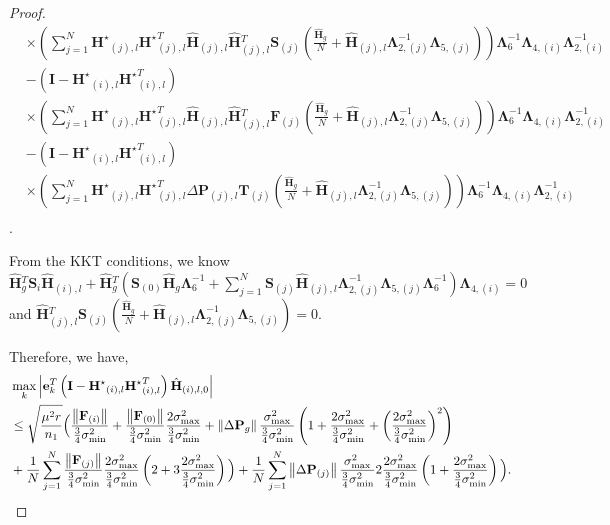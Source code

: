 \documentclass[twoside,11pt]{article}
\newcommand{\abs}[1]{\left\vert #1\right\vert}
\newcommand{\norm}[1]{\left\lVert#1\right\rVert}
\newcommand{\matF}{\mathbf{F}}
\newcommand{\hmatH}{{\hat{\mathbf{H}}}{}}
\newcommand{\matHst}{{\mathbf{H}^\star}}
\newcommand{\matI}{\mathbf{I}}
\newcommand{\matP}{\mathbf{P}}
\newcommand{\matT}{\mathbf{T}}
\newcommand{\matLambda}{\mathbf{\Lambda}}
\newcommand{\matS}{\mathbf{S}}
\newcommand{\vece}{\mathbf{e}}
\newcommand{\gop}{\sigma_{\max}}
\newcommand{\murnone}{\frac{\mu^2 r}{n_1}}
\newcommand{\sms}{\sigma_{\min}^2}
\newcommand{\tkappa}{\frac{2\gop^2}{\frac{3}{4}\sms}}
\newcommand{\brtkappa}{\left(\frac{2\gop^2}{\frac{3}{4}\sms}\right)}
\begin{document}
\begin{proof}
\begin{align*}
&\times\left(\sum_{j=1}^N\matHst_{(j),l}\matHst_{(j),l}^T\hmatH_{(j),l}\hmatH_{(j),l}^T\matS_{(j)}\left(\frac{\hmatH_{g}}{N}+\hmatH_{(j),l} \matLambda_{2,(j)}^{-1} \matLambda_{5,(j)}\right)\right)\matLambda_{6}^{-1}\matLambda_{4,(i)}\matLambda_{2,(i)}^{-1}\\
&-\left(\matI-\matHst_{(i),l}\matHst_{(i),l}^T\right)\\
&\times\left(\sum_{j=1}^N\matHst_{(j),l}\matHst_{(j),l}^T\hmatH_{(j),l}\hmatH_{(j),l}^T\matF_{(j)}\left(\frac{\hmatH_{g}}{N}+\hmatH_{(j),l} \matLambda_{2,(j)}^{-1} \matLambda_{5,(j)}\right)\right)\matLambda_{6}^{-1}\matLambda_{4,(i)}\matLambda_{2,(i)}^{-1}\\
&-\left(\matI-\matHst_{(i),l}\matHst_{(i),l}^T\right)\\
&\times\left(\sum_{j=1}^N\matHst_{(j),l}\matHst_{(j),l}^T\Delta\matP_{(j),l}\matT_{(j)}\left(\frac{\hmatH_{g}}{N}+\hmatH_{(j),l} \matLambda_{2,(j)}^{-1} \matLambda_{5,(j)}\right)\right)\matLambda_{6}^{-1}\matLambda_{4,(i)}\matLambda_{2,(i)}^{-1}\\
\end{align*}.

From the KKT conditions, we know $\hmatH_g^T\matS_{i}\hmatH_{(i),l}+\hmatH_g^T\left(\matS_{(0)}\hmatH_{g}\matLambda_{6}^{-1}+\sum_{j=1}^N\matS_{(j)}\hmatH_{(j),l} \matLambda_{2,(j)}^{-1} \matLambda_{5,(j)}\matLambda_{6}^{-1}\right)\matLambda_{4,(i)}=0$ and $\hmatH_{(j),l}^T\matS_{(j)}\left(\frac{\hmatH_{g}}{N}+\hmatH_{(j),l} \matLambda_{2,(j)}^{-1} \matLambda_{5,(j)}\right)=0$.

Therefore, we have,
\begin{align}
&\max_k\abs{\vece_k^T\left(\matI-\matHst_{(i),l}\matHst_{(i),l}^T\right)\hmatH_{(i),l,0}}\notag\\
&\le \sqrt{\murnone}\Big(\frac{\norm{\matF_{(i)}}}{\frac{3}{4}\sms}+\frac{\norm{\matF_{(0)}}}{\frac{3}{4}\sms}\tkappa+\norm{\Delta\matP_{g}}\frac{\gop^2}{\frac{3}{4}\sms}\left(1+\tkappa+\brtkappa^2\right)\notag\\
&+\frac{1}{N}\sum_{j=1}^N\frac{\norm{\matF_{(j)}}}{\frac{3}{4}\sms}\tkappa\left(2+3\tkappa\right)\Big)+\frac{1}{N}\sum_{j=1}^N\norm{\Delta\matP_{(j)}}\frac{\gop^2}{\frac{3}{4}\sms}2\tkappa\left(1+\tkappa\right)\Big).\notag\\
\label{eqn:secondthird}
\end{align}


\end{proof}
\end{document}
